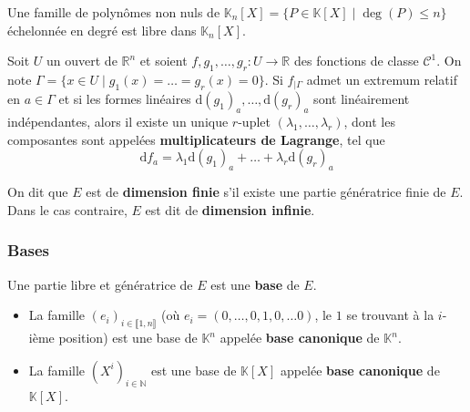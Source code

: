 
  \begin{proposition}
    Une famille de polynômes non nuls de $\mathbb{K}_n[X] = \{ P \in \mathbb{K}[X] \mid \deg(P) \leq n \}$ échelonnée en degré est libre dans $\mathbb{K}_n[X]$.
  \end{proposition}


  \begin{application}
    Soit $U$ un ouvert de $\mathbb{R}^n$ et soient $f, g_1, \dots, g_r : U \rightarrow \mathbb{R}$ des fonctions de classe $\mathcal{C}^1$. On note $\Gamma = \{ x \in U \mid g_1(x) = \dots = g_r(x) = 0 \}$. Si $f_{|\Gamma}$ admet un extremum relatif en $a \in \Gamma$ et si les formes linéaires $\mathrm{d}(g_1)_a, \dots, \mathrm{d}(g_r)_a$ sont linéairement indépendantes, alors il existe un unique $r$-uplet $(\lambda_1, \dots, \lambda_r)$, dont les composantes sont appelées \textbf{multiplicateurs de Lagrange}, tel que
    \[ \mathrm{d}f_a = \lambda_1 \mathrm{d}(g_1)_a + \dots + \lambda_r \mathrm{d}(g_r)_a \]
  \end{application}


  \begin{definition}
    On dit que $E$ est de \textbf{dimension finie} s'il existe une partie génératrice finie de $E$. Dans le cas contraire, $E$ est dit de \textbf{dimension infinie}.
  \end{definition}

  \subsubsection{Bases}

  \begin{definition}
    Une partie libre et génératrice de $E$ est une \textbf{base} de $E$.
  \end{definition}

  \begin{example}
    \begin{itemize}
      \item La famille $(e_i)_{i \in \llbracket 1, n \rrbracket}$ (où $e_i = (0, \dots, 0, 1, 0, \dots 0)$, le $1$ se trouvant à la $i$-ième position) est une base de $\mathbb{K}^n$ appelée \textbf{base canonique} de $\mathbb{K}^n$.
      \item La famille $(X^i)_{i \in \mathbb{N}}$ est une base de $\mathbb{K}[X]$ appelée \textbf{base canonique} de $\mathbb{K}[X]$.
    \end{itemize}
  \end{example}

